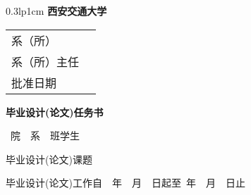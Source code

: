 





\parindent=0pt
\renewcommand{\baselinestretch}{1.6}\selectfont

\begin{minipage}[t]{1\linewidth} 
\hskip 2cm
\begin{tabular*}{0.3\linewidth}{lp{1cm}}
{\bf \LARGE 西安交通大学 }
\end{tabular*}
\hskip 2.5cm
\begin{tabular*}{0.2\linewidth}{lp{2cm}}
系（所） &\\
系（所）主任&\\
批准日期 & \\ 
\end{tabular*}
 \end{minipage}
\vspace{1em}


\begin{center}\bfseries\huge %
毕业设计(论文)任务书   
\vspace{1em}
\end{center}
\par\myunderline{\@college}~院~\myunderline{\@department}~系~\myunderline{\@class}~班\hspace{\ccwd}学生\CJKunderline{\hfill \@student \hfill}

\par 毕业设计(论文)课题\hspace{1ex}\CJKunderline{\hfill \@yourtitle \hfill}

\par 毕业设计(论文)工作自~\myunderline[3]{\@beginyear}~年~\myunderline[2]{\@beginmonth}~月~\myunderline[1.5]{\@begindate}~日起至\myunderline[3]{\@endyear}~年~\myunderline[2]{\@endmonth}~月~\myunderline[1.5]{\@enddate}~日止

